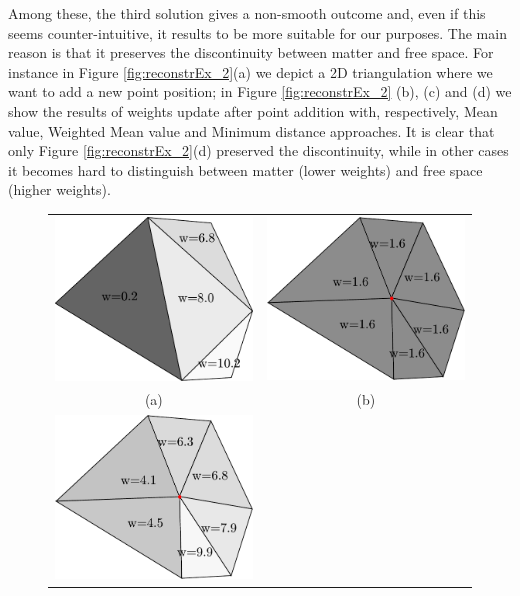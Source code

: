 Among these, the third solution gives a non-smooth outcome and, even if this seems counter-intuitive, it results to be more suitable for our purposes. The main reason is that it preserves the discontinuity between matter and free space. For instance in Figure \ref{fig:reconstrEx_2}(a) we depict a 2D triangulation where we want to add a new point position; in Figure \ref{fig:reconstrEx_2} (b), (c) and (d) we show the results of weights update after point addition with, respectively, Mean value, Weighted Mean value and Minimum distance approaches. 
It is clear that only Figure \ref{fig:reconstrEx_2}(d) preserved the discontinuity, while in other cases it becomes hard to distinguish between matter (lower weights) and free space (higher weights). 


\begin{figure}[t]
\begin{center}
\begin{tabular}{cc}
\centering
\includegraphics[width=0.42\columnwidth]{./img//mooving_orig}&
\includegraphics[width=0.42\columnwidth]{./img//mooving_avg}\\
(a) & (b) \\
\includegraphics[width=0.42\columnwidth]{./img//mooving_weighted_avg}&

\end{tabular}
\end{center}
\end{figure}
